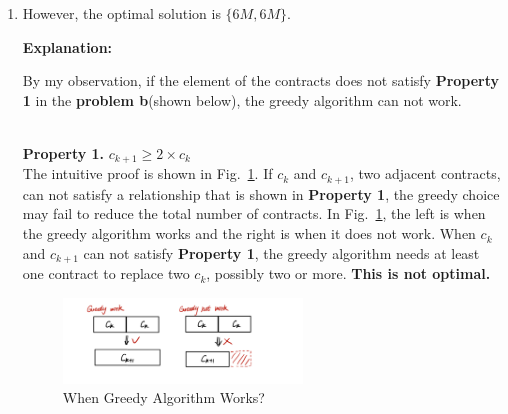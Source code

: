 \documentclass[12pt,a4paper]{article}
\makeatletter
\newtheorem*{solution}{Solution}
\theoremstyle{definition}
\renewenvironment{solution}[1][Solution] {\par\pushQED{\qed}\normalfont\topsep6\p@\@plus6\p@\relax\trivlist\item[\hskip\labelsep\bfseries#1\@addpunct{.}]\ignorespaces}{\popQED\endtrivlist\@endpefalse} \makeatother
\makeatother
\begin{document}
\begin{enumerate}
\begin{solution}
\begin{enumerate}
However, the optimal solution is $\{6M, 6M\}$.

\textbf{Explanation:}

By my observation, if the element of the contracts does not satisfy \textbf{Property 1} in the \textbf{problem b}(shown below), the greedy algorithm can not work. 

~\\
\textbf{Property 1.} $c_{k+1}\geq 2\times c_{k}$
~\\

The intuitive proof is shown in Fig.~\ref{explain}. If $c_k$ and $c_{k+1}$, two adjacent contracts, can not satisfy a relationship that is shown in \textbf{Property 1}, the greedy choice may fail to reduce the total number of contracts. In Fig.~\ref{explain}, the left is when the greedy algorithm works and the right is when it does not work. When $c_k$ and $c_{k+1}$ can not satisfy \textbf{Property 1}, the greedy algorithm needs at least one contract to replace two $c_k$, possibly two or more. \textbf{This is not optimal.}



\begin{figure}[htbp]
    \centering
    \includegraphics[width=0.6\textwidth]{explain.jpg}
    \caption{When Greedy Algorithm Works?}\label{explain}
\end{figure}

\end{enumerate}
    \end{solution}
	

\end{enumerate}
\end{document}
